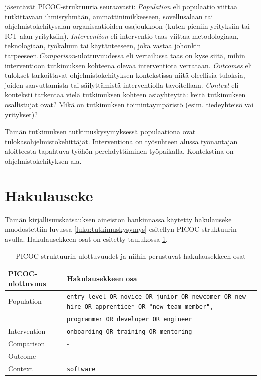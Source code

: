 \documentclass[utf8]{gradu3}
\begin{document}
\textcite{kitchenham-charters-2007} jäsentävät PICOC-struktuuria seuraavasti: \textit{Population} eli populaatio viittaa tutkittavaan ihmisryhmään, ammattinimikkeeseen, sovellusalaan tai ohjelmistokehitysalan organisaatioiden osajoukkoon (kuten pieniin yrityksiin tai ICT-alan yrityksiin). \textit{Intervention} eli interventio taas viittaa metodologiaan, teknologiaan, työkaluun tai käytänteeseen, joka vastaa johonkin tarpeeseen.\textit{Comparison}-ulottuvuudessa eli vertailussa taas on kyse siitä, mihin interventioon tutkimuksen kohteena olevaa interventiota verrataan. \textit{Outcomes} eli tulokset tarkoittavat ohjelmistokehityksen kontekstissa niitä oleellisia tuloksia, joiden saavuttamista tai säilyttämistä interventiolla tavoitellaan. \textit{Context} eli konteksti tarkentaa vielä tutkimuksen kohteen asiayhteyttä: keitä tutkimuksen osallistujat ovat? Mikä on tutkimuksen toimintaympäristö (esim. tiedeyhteisö vai yritykset)? \parencite{kitchenham-charters-2007}

Tämän tutkimuksen tutkimuskysymyksessä populaationa ovat tulokasohjelmistokehittäjät. Interventiona on työsuhteen alussa työnantajan aloitteesta tapahtuva työhön perehdyttäminen työpaikalla. Kontekstina on ohjelmistokehityksen ala. 

\section{Hakulauseke}

Tämän kirjallisuuskatsauksen aineiston hankinnassa käytetty hakulauseke muodostettiin luvussa  \ref{luku:tutkimuskysymys} esitellyn PICOC-struktuurin avulla. Hakulausekkeen osat on esitetty taulukossa \ref{tbl:picoc-ulottuvuudet}.

\begin{table}[h]
    \footnotesize
    \begin{tabular}{lp{}}
        \toprule
        {PICOC-ulottuvuus} & Hakulausekkeen osa \\
        \midrule
        Population & {\tt entry level OR novice OR junior OR newcomer OR new hire OR apprentice* OR "new team member", } \\
        & {\tt programmer OR developer OR engineer} \\
        \midrule
        Intervention & {\tt onboarding OR training OR mentoring} \\
        \midrule
        Comparison & - \\
        \midrule
        Outcome & - \\
        \midrule
        Context & {\tt software} \\
        \bottomrule
    \end{tabular}  
    \caption{PICOC-struktuurin ulottuvuudet ja niihin perustuvat hakulausekkeen osat}
    \label{tbl:picoc-ulottuvuudet}
\end{table}
\end{document}
